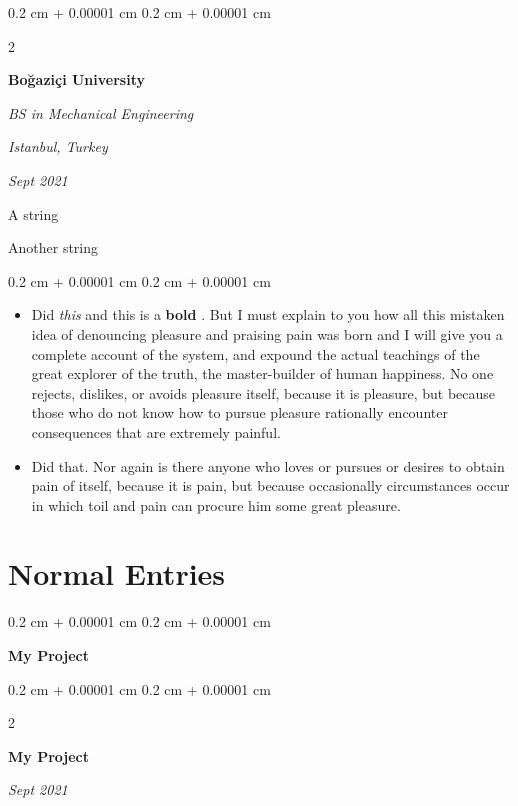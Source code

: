 \documentclass[10pt, letterpaper]{article}
\newenvironment{summary}{
    \begin{description}[
        topsep=0.10 cm,
        parsep=0.10 cm,
        partopsep=0pt,
        itemsep=0pt,
        leftmargin=0.4 cm + 10pt
    ]
}{
    \end{description}
} %
\newenvironment{highlights}{
    \begin{itemize}[
        topsep=0.10 cm,
        parsep=0.10 cm,
        partopsep=0pt,
        itemsep=0pt,
        leftmargin=0.4 cm + 10pt
    ]
}{
    \end{itemize}
} %
\newenvironment{onecolentry}{
    \begin{adjustwidth}{
        0.2 cm + 0.00001 cm
    }{
        0.2 cm + 0.00001 cm
    }
}{
    \end{adjustwidth}
} %
\newenvironment{twocolentry}[2][]{
    \onecolentry
    \def\secondColumn{#2}
    \setcolumnwidth{\fill, 4.5 cm}
    \begin{paracol}{2}
}{
    \switchcolumn \raggedleft \secondColumn
    \end{paracol}
    \endonecolentry
} %
\let\hrefWithoutArrow\href
\renewcommand{\href}[2]{\hrefWithoutArrow{#1}{\ifthenelse{\equal{#2}{}}{ }{#2 }\raisebox{.15ex}{\footnotesize \faExternalLink*}}}
\begin{document}
        \begin{twocolentry}{
        \textit{Istanbul, Turkey}    
            
        \textit{Sept 2021}}
            \textbf{Boğaziçi University}

            \textit{BS in Mechanical Engineering}
        \end{twocolentry}
            \begin{summary}
                \item A string
                \item Another string
            \end{summary}
        \vspace{0.10 cm}
        \begin{onecolentry}
            \begin{highlights}
                \item Did \textit{this} and this is a \textbf{bold} \href{https://example.com}{link}. But I must explain to you how all this mistaken idea of denouncing pleasure and praising pain was born and I will give you a complete account of the system, and expound the actual teachings of the great explorer of the truth, the master-builder of human happiness. No one rejects, dislikes, or avoids pleasure itself, because it is pleasure, but because those who do not know how to pursue pleasure rationally encounter consequences that are extremely painful.
                \item Did that. Nor again is there anyone who loves or pursues or desires to obtain pain of itself, because it is pain, but because occasionally circumstances occur in which toil and pain can procure him some great pleasure.
            \end{highlights}
        \end{onecolentry}



    
    \section{Normal Entries}



        
        \begin{onecolentry}
            \textbf{My Project}
        \end{onecolentry}


        \vspace{0.2 cm}

        \begin{twocolentry}{
            
            
        \textit{Sept 2021}}
            \textbf{My Project}
        \end{twocolentry}
\end{document}

